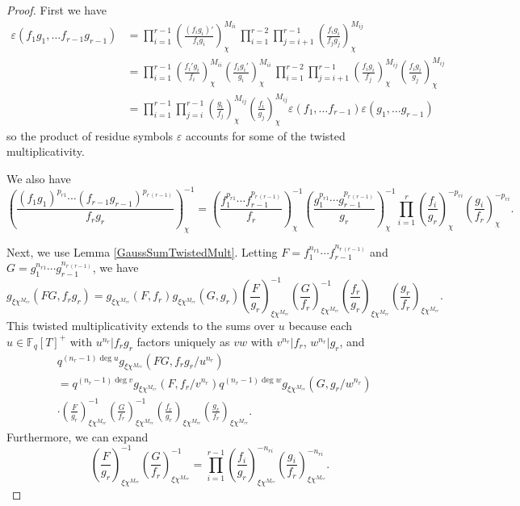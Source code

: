 \documentclass[11pt,letterpaper]{article}
\theoremstyle{definition}
\theoremstyle{remark}
\numberwithin{equation}{section}
\theoremstyle{dotless}
\newcommand{\F}{\mathbb{F}}
\newcommand{\res}[2]{\left(\frac{#1}{#2}\right)}
\begin{document}
\begin{proof}
First we have 
\begin{equation*}
\begin{split}
\varepsilon(f_1g_1, \ldots f_{r-1}g_{r-1}) &= \prod_{i=1}^{r-1} \res{(f_ig_i)'}{f_ig_i}_{\chi}^{M_{ii}} \, \prod_{i=1}^{r-2}\prod_{j=i+1}^{r-1} \res{f_ig_i}{f_jg_j}_{\chi}^{M_{ij}} \\
&=\prod_{i=1}^{r-1} \res{f_i'g_i}{f_i}_{\chi}^{M_{ii}}\res{f_ig_i'}{g_i}_{\chi}^{M_{ii}} \, \prod_{i=1}^{r-2}\prod_{j=i+1}^{r-1} \res{f_ig_i}{f_j}_{\chi}^{M_{ij}}\res{f_ig_i}{g_j}_{\chi}^{M_{ij}}  \\
&=\prod_{i=1}^{r-1}\prod_{j=i}^{r-1} \res{g_i}{f_j}_{\chi}^{M_{ij}}\res{f_i}{g_j}_{\chi}^{M_{ij}} \varepsilon(f_1, \ldots f_{r-1})\varepsilon(g_1, \ldots g_{r-1})
\end{split}
\end{equation*}
so the product of residue symbols $\varepsilon$ accounts for some of the twisted multiplicativity. 

We also have
\begin{equation*}
\res{(f_1g_1)^{p_{r1}}\cdots (f_{r-1}g_{r-1})^{p_{r \, (r-1)}}}{f_rg_r}_{\chi}^{-1} = \res{f_1^{p_{r1}}\cdots f_{r-1}^{p_{r \, (r-1)}}}{f_r}_{\chi}^{-1} \res{g_1^{p_{r1}}\cdots g_{r-1}^{p_{r \, (r-1)}}}{g_r}_{\chi}^{-1} \prod_{i=1}^r \res{f_i}{g_r}^{-p_{ri}}_{\chi} \res{g_i}{f_r}^{-p_{ri}}_{\chi}.
\end{equation*}

Next, we use Lemma \ref{GaussSumTwistedMult}. Letting $F=f_1^{n_{r1}}\cdots f_{r-1}^{n_{r \, (r-1)}}$ and $G=g_1^{n_{r1}}\cdots g_{r-1}^{n_{r \, (r-1)}}$, we have 
\begin{equation*}
g_{\xi \chi^{M_{rr}}}(FG, f_rg_r)=g_{\xi \chi^{M_{rr}}}(F, f_r)g_{\xi \chi^{M_{rr}}}(G, g_r)\res{F}{g_r}_{\xi \chi^{M_{rr}}}^{-1}\res{G}{f_r}_{\xi \chi^{M_{rr}}}^{-1} \res{f_r}{g_r}_{\xi \chi^{M_{rr}}}\res{g_r}{f_r}_{\xi \chi^{M_{rr}}}.
\end{equation*} 
This twisted multiplicativity extends to the sums over $u$ because each $u \in \F_q[T]^+$ with $u^{n_r}|f_rg_r$ factors uniquely as $vw$ with $v^{n_r}|f_r$, $w^{n_r}|g_r$, and 
\begin{equation*} 
\begin{split}
&q^{(n_r-1)\deg u} g_{\xi \chi^{M_{rr}}}(FG, f_rg_r/u^{n_r}) \\
&= q^{(n_r-1)\deg v}g_{\xi \chi^{M_{rr}}}(F, f_r/v^{n_r})q^{(n_r-1)\deg w}g_{\xi \chi^{M_{rr}}}(G, g_r/w^{n_r}) \\
&\cdot \res{F}{g_r}_{\xi \chi^{M_{rr}}}^{-1} \res{G}{f_r}_{\xi \chi^{M_{rr}}}^{-1} \res{f_r}{g_r}_{\xi \chi^{M_{rr}}} \res{g_r}{f_r}_{\xi \chi^{M_{rr}}}.
\end{split}
\end{equation*}
Furthermore, we can expand
\begin{equation*}
\res{F}{g_r}_{\xi \chi^{M_{rr}}}^{-1}\res{G}{f_r}_{\xi \chi^{M_{rr}}}^{-1} = \prod_{i=1}^{r-1} \res{f_i}{g_r}_{\xi \chi^{M_{rr}}}^{-n_{ri}} \res{g_i}{f_r}_{\xi \chi^{M_{rr}}}^{-n_{ri}}.
\end{equation*}


\end{proof}
\end{document}
